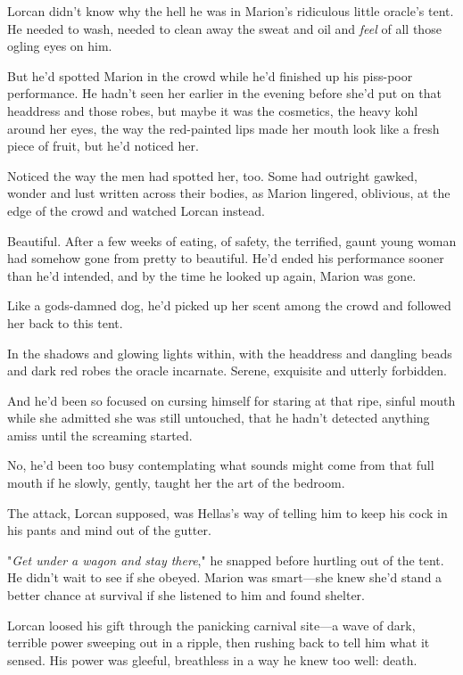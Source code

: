 Lorcan didn't know why the hell he was in Marion's ridiculous little oracle's tent. He needed to wash, needed to clean away the sweat and oil and \emph{feel} of all those ogling eyes on him.

But he'd spotted Marion in the crowd while he'd finished up his piss-poor performance. He hadn't seen her earlier in the evening before she'd put on that headdress and those robes, but  maybe it was the cosmetics, the heavy kohl around her eyes, the way the red-painted lips made her mouth look like a fresh piece of fruit, but  he'd noticed her.

Noticed the way the men had spotted her, too. Some had outright gawked, wonder and lust written across their bodies, as Marion lingered, oblivious, at the edge of the crowd and watched Lorcan instead.

Beautiful. After a few weeks of eating, of safety, the terrified, gaunt young woman had somehow gone from pretty to beautiful. He'd ended his performance sooner than he'd intended, and by the time he looked up again, Marion was gone.

Like a gods-damned dog, he'd picked up her scent among the crowd and followed her back to this tent.

In the shadows and glowing lights within, with the headdress and dangling beads and dark red robes  the oracle incarnate. Serene, exquisite  and utterly forbidden.

And he'd been so focused on cursing himself for staring at that ripe, sinful mouth while she admitted she was still untouched, that he hadn't detected anything amiss until the screaming started.

No, he'd been too busy contemplating what sounds might come from that full mouth if he slowly, gently, taught her the art of the bedroom.

The attack, Lorcan supposed, was Hellas's way of telling him to keep his cock in his pants and mind out of the gutter.

"\emph{Get under a wagon and stay there}," he snapped before hurtling out of the tent. He didn't wait to see if she obeyed. Marion was smart---she knew she'd stand a better chance at survival if she listened to him and found shelter.

Lorcan loosed his gift through the panicking carnival site---a wave of dark, terrible power sweeping out in a ripple, then rushing back to tell him what it sensed. His power was gleeful, breathless in a way he knew too well: death.

